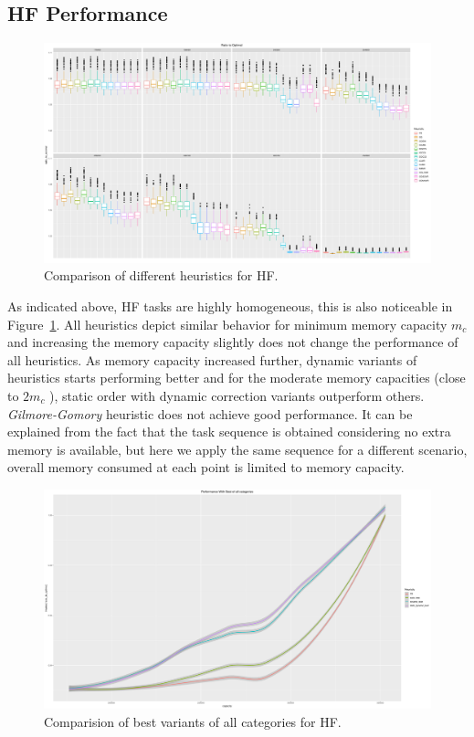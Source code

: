 \documentclass[sigconf]{acmart}
\begin{document}
{	\subsection{HF Performance}	
	\begin{figure}[htb]
		\includegraphics[scale=0.25]{./results/plots/ratio_to_optimal_selected_hf.pdf}
		\caption{Comparison of different heuristics for HF.}
		\label{fig:ratio_to_optimal_hf}
	\end{figure}
	As indicated above, HF tasks are highly homogeneous, this is also noticeable in Figure~\ref{fig:ratio_to_optimal_hf}. All heuristics depict similar behavior for minimum memory capacity $m_c$  and  increasing the memory capacity slightly does not change the performance of all heuristics. As memory capacity increased further, dynamic variants of heuristics starts performing better and for the moderate memory capacities (close to $2m_c$ ), static order with dynamic correction variants outperform others. \textit{Gilmore-Gomory} heuristic does not achieve good performance. It can be explained from the fact that the task sequence is obtained considering no extra memory is available, but here we apply the same sequence for a different scenario,  overall memory consumed at each point is limited to memory capacity.
	
	
	\begin{figure}[htb]
		\includegraphics[scale=0.15]{./results/plots/inverse_ratio_to_optimal_hf-best.pdf}
		\caption{Comparision of best variants of all categories for HF.}
		\label{fig:ratio_to_optimal_best_hf}
	\end{figure}
	
}
\end{document}
